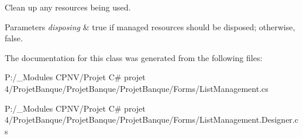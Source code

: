 Clean up any resources being used. 


\begin{DoxyParams}{Parameters}
{\em disposing} & true if managed resources should be disposed; otherwise, false.\\
\hline
\end{DoxyParams}


The documentation for this class was generated from the following files\+:\begin{DoxyCompactItemize}
\item 
P\+:/\+\_\+\+Modules C\+P\+N\+V/\+Projet C\# projet 4/\+Projet\+Banque/\+Projet\+Banque/\+Projet\+Banque/\+Forms/List\+Management.\+cs\item 
P\+:/\+\_\+\+Modules C\+P\+N\+V/\+Projet C\# projet 4/\+Projet\+Banque/\+Projet\+Banque/\+Projet\+Banque/\+Forms/List\+Management.\+Designer.\+cs\end{DoxyCompactItemize}
